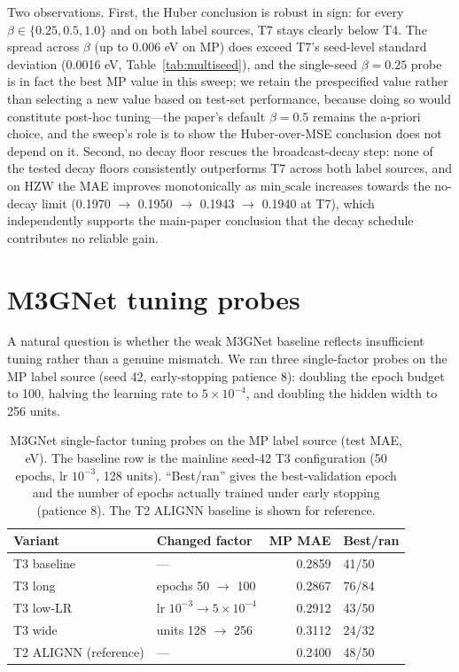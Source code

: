 \documentclass[a4paper,10pt]{article}
\begin{document}
Two observations. First, the Huber conclusion is robust in sign: for every \(\beta\in\{0.25,0.5,1.0\}\) and on both label sources, T7 stays clearly below T4. The spread across \(\beta\) (up to 0.006 eV on MP) does exceed T7's seed-level standard deviation (0.0016 eV, Table~\ref{tab:multiseed}), and the single-seed \(\beta=0.25\) probe is in fact the best MP value in this sweep; we retain the prespecified value rather than selecting a new value based on test-set performance, because doing so would constitute post-hoc tuning---the paper's default \(\beta=0.5\) remains the a-priori choice, and the sweep's role is to show the Huber-over-MSE conclusion does not depend on it. Second, no decay floor rescues the broadcast-decay step: none of the tested decay floors consistently outperforms T7 across both label sources, and on HZW the MAE improves monotonically as \(\mathrm{min\_scale}\) increases towards the no-decay limit (0.1970 \(\to\) 0.1950 \(\to\) 0.1943 \(\to\) 0.1940 at T7), which independently supports the main-paper conclusion that the decay schedule contributes no reliable gain.

\section{M3GNet tuning probes}

A natural question is whether the weak M3GNet baseline reflects insufficient tuning rather than a genuine mismatch. We ran three single-factor probes on the MP label source (seed 42, early-stopping patience 8): doubling the epoch budget to 100, halving the learning rate to \(5\times10^{-4}\), and doubling the hidden width to 256 units.

\begin{table}[htbp]
\centering
\caption{M3GNet single-factor tuning probes on the MP label source (test MAE, eV). The baseline row is the mainline seed-42 T3 configuration (50 epochs, lr \(10^{-3}\), 128 units). ``Best/ran'' gives the best-validation epoch and the number of epochs actually trained under early stopping (patience 8). The T2 ALIGNN baseline is shown for reference.}
\label{tab:m3gnet-tuning}
\small
\begin{tabular}{l l r l}
\toprule
Variant & Changed factor & MP MAE & Best/ran \\
\midrule
T3 baseline & --- & 0.2859 & 41/50 \\
T3 long     & epochs 50 \(\to\) 100 & 0.2867 & 76/84 \\
T3 low-LR   & lr \(10^{-3} \to 5\times10^{-4}\) & 0.2912 & 43/50 \\
T3 wide     & units 128 \(\to\) 256 & 0.3112 & 24/32 \\
\midrule
T2 ALIGNN (reference) & --- & 0.2400 & 48/50 \\
\bottomrule
\end{tabular}
\end{table}
\end{document}
